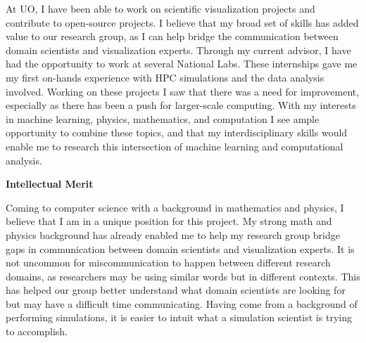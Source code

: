 \documentclass[12pt]{article}
\begin{document}
At UO, I have been able to work on scientific visualization
projects and contribute to open-source projects. I believe that my broad set of
skills has added value to our research group, as I can help bridge the
communication between domain scientists and visualization experts. Through
my current advisor, I have had the opportunity to work at several National Labs.
These internships gave me my first on-hands experience with HPC simulations and
the data analysis involved. Working on these projects I saw that there was a need
for improvement, especially as there has been a push for larger-scale computing.
With my interests in machine learning, physics, mathematics, and computation I
see ample opportunity to combine these topics, and that my interdisciplinary
skills would enable me to research this intersection of machine learning and
computational analysis.

\textbf{Intellectual Merit}
%

Coming to computer science with a background in mathematics and physics, I
believe that I am in a unique position for this project. My strong math and
physics background has already enabled me to help my research group bridge gaps
in communication between domain scientists and visualization experts. It is not
uncommon for miscommunication to happen between different research domains, as
researchers may be using similar words but in different contexts. This has
helped our group better understand what domain scientists are looking for but
may have a difficult time communicating. Having come from a background of
performing simulations, it is easier to intuit what a simulation scientist is
trying to accomplish.
\end{document}
